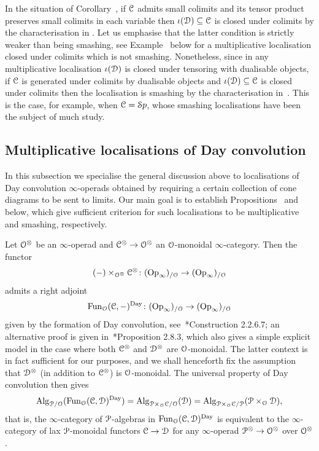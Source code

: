 \begin{remark}
\label{remark:smashing-closed-colimits}%
In the situation of Corollary~, if $\mathcal C$ admits small colimits and its tensor product preserves small colimits in each variable then $\iota(\mathcal{D}) \subseteq \mathcal C$ is closed under colimits by the characterisation in . Let us emphasise that the latter condition is strictly weaker than being smashing, see Example~ below for a multiplicative localisation closed under colimits which is not smashing. Nonetheless, since in any multiplicative localisation $\iota(\mathcal{D})$ is closed under tensoring with dualisable objects, if $\mathcal C$ is generated under colimits by dualisable objects and $\iota(\mathcal{D}) \subseteq \mathcal C$ is closed under colimits then the localisation is smashing by the characterisation in~. This is the case, for example, when $\mathcal C={\mathcal Sp}$, whose smashing localisations have been the subject of much study.
\end{remark}





\subsection{Multiplicative localisations of Day convolution}
\label{subsection:day-convolution}%
\label{subsec:large-indexing}%

In this subsection we specialise the general discussion above to localisations of Day convolution $\infty$-operads obtained by requiring a certain collection of cone diagrams to be sent to limits. Our main goal is to establish Propositions~ and  below, which give sufficient criterion for such localisations to be multiplicative and smashing, respectively. 


Let $\mathcal{O}^{\otimes}$ be an $\infty$-operad and $\mathcal C^{\otimes} \to \mathcal{O}^{\otimes}$ an $\mathcal{O}$-monoidal $\infty$-category. Then 
the functor
\[
(-) \times_{\mathcal{O}^{\otimes}} \mathcal C^{\otimes} \colon (\mathrm{Op}_\infty)_{/\mathcal{O}} \to (\mathrm{Op}_\infty)_{/\mathcal{O}}
\]
admits a right adjoint
\[
\operatorname{Fun}_{\mathcal{O}}(\mathcal C,-)^{\mathrm{Day}}\colon (\mathrm{Op}_\infty)_{/\mathcal{O}} \to (\mathrm{Op}_\infty)_{/\mathcal{O}}
\]
given by the formation of Day convolution, see~\cite{HA}*{Construction 2.2.6.7}; an alternative proof is given in~\cite{hinich-enriched}*{Proposition 2.8.3}, which also gives a simple explicit model in the case where both $\mathcal C^{\otimes}$ and $\mathcal{D}^{\otimes}$ are $\mathcal{O}$-monoidal. The latter context is in fact sufficient for our purposes, and we shall henceforth fix the assumption that $\mathcal{D}^{\otimes}$ (in addition to $\mathcal C^{\otimes}$) is $\mathcal{O}$-monoidal.
The universal property of Day convolution then gives %
\[
\mathrm{Alg}_{\mathcal{P}/\mathcal{O}}(\operatorname{Fun}_{\mathcal{O}}(\mathcal C,\mathcal{D})^{\mathrm{Day}}) = \mathrm{Alg}_{\mathcal{P} \times_{\mathcal{O}} \mathcal C/\mathcal{O}}(\mathcal{D}) =  \mathrm{Alg}_{\mathcal{P} \times_{\mathcal{O}} \mathcal C/\mathcal{P}}(\mathcal{P} \times_{\mathcal{O}}\mathcal{D}) ,
\]
that is, the $\infty$-category of $\mathcal{P}$-algebras in $\operatorname{Fun}_{\mathcal{O}}(\mathcal C,\mathcal{D})^{\mathrm{Day}}$ is equivalent to the $\infty$-category of lax $\mathcal{P}$-monoidal functors $\mathcal C \to \mathcal{D}$ for any $\infty$-operad $\mathcal{P}^{\otimes} \to \mathcal{O}^{\otimes}$ over $\mathcal{O}^{\otimes}$. 


